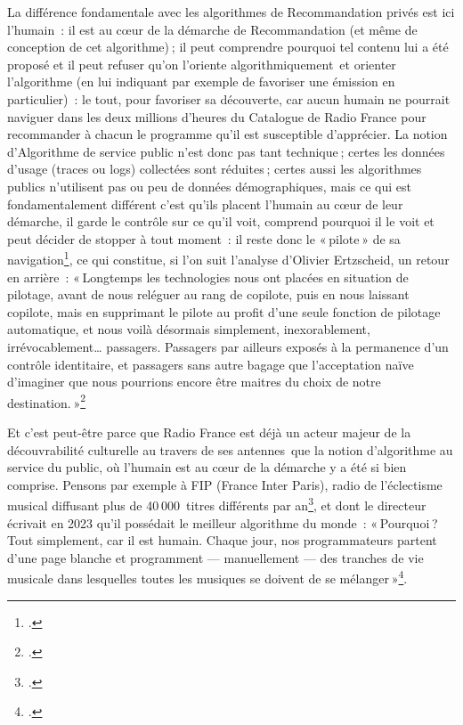 La différence fondamentale avec les algorithmes de Recommandation privés est ici l’humain : il est au cœur de la démarche de Recommandation (et même de conception de cet algorithme) ; il peut comprendre pourquoi tel contenu lui a été proposé et il peut refuser qu’on l’oriente algorithmiquement et orienter l’algorithme (en lui indiquant par exemple de favoriser une émission en particulier) : le tout, pour favoriser sa découverte, car aucun humain ne pourrait naviguer dans les deux millions d’heures du Catalogue de Radio France pour recommander à chacun le programme qu’il est susceptible d’apprécier. La notion d’Algorithme de service public n’est donc pas tant technique ; certes les données d’usage (traces ou logs) collectées sont réduites ; certes aussi les algorithmes publics n’utilisent pas ou peu de données démographiques, mais ce qui est fondamentalement différent c’est qu’ils placent l’humain au cœur de leur démarche, il garde le contrôle sur ce qu’il voit, comprend pourquoi il le voit et peut décider de stopper à tout moment : il reste donc le « pilote » de sa navigation\footcite{ertzscheid2024a}, ce qui constitue, si l’on suit l’analyse d’Olivier Ertzscheid, un retour en arrière : 
« Longtemps les technologies nous ont placées en situation de pilotage, avant de nous reléguer au rang de copilote, puis en nous laissant copilote, mais en supprimant le pilote au profit d’une seule fonction de pilotage automatique, et nous voilà désormais simplement, inexorablement, irrévocablement… passagers. Passagers par ailleurs exposés à la permanence d’un contrôle identitaire, et passagers sans autre bagage que l’acceptation naïve d’imaginer que nous pourrions encore être maitres du choix de notre destination. »\footcite{ertzscheid2024a}

Et c’est peut-être parce que Radio France est déjà un acteur majeur de la découvrabilité culturelle au travers de ses antennes que la notion d’algorithme au service du public, où l’humain est au cœur de la démarche y a été si bien comprise. Pensons par exemple à FIP (France Inter Paris), radio de l’éclectisme musical diffusant plus de 40 000 titres différents par an\footcite{2023a}, et dont le directeur écrivait en 2023 qu’il possédait le meilleur algorithme du monde : « Pourquoi ? Tout simplement, car il est humain. Chaque jour, nos programmateurs partent d’une page blanche et programment — manuellement — des tranches de vie musicale dans lesquelles toutes les musiques se doivent de se mélanger »\footcite{2023a}.


